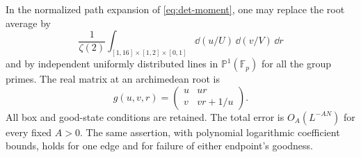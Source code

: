 \begin{lemma}\label{det:root-replacement}
In the normalized path expansion of \eqref{eq:det-moment}, one
may replace the root average by
\[
 \frac1{\zeta(2)}\int_{[1,16]\times[1,2]\times[0,1]}
                  \dd(u/U)\,\dd(v/V)\,\dd r
\]
and by independent uniformly distributed lines in
$\mathbb P^1(\mathbb F_p)$ for all the group primes.  The real
matrix at an archimedean root is
\[
 g(u,v,r)=\begin{pmatrix}u&ur\\v&vr+1/u\end{pmatrix}.
\]
All box and good-state conditions are retained.  The total error
is $O_A(L^{-AN})$ for every fixed $A>0$.  The same assertion,
with polynomial logarithmic coefficient bounds, holds for one
edge and for failure of either endpoint's goodness.
\end{lemma}

